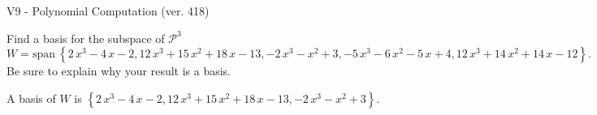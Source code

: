 \begin{exercise}
  \begin{exerciseTitle}V9 - Polynomial Computation (ver. 418)\end{exerciseTitle}
  \begin{exerciseStatement}
    Find a basis for the subspace of \(\mathcal{P}^3\) 
\[W=\mathrm{span}\ \left\{2 \, x^{3} - 4 \, x - 2 , 12 \, x^{3} + 15 \, x^{2} + 18 \, x - 13 , -2 \, x^{3} - x^{2} + 3 , -5 \, x^{3} - 6 \, x^{2} - 5 \, x + 4 , 12 \, x^{3} + 14 \, x^{2} + 14 \, x - 12\right\}.\]
 Be sure to explain why your result is a basis.


  \end{exerciseStatement}
  \begin{exerciseAnswer}
   A basis of \(W\) is  \(\left\{2 \, x^{3} - 4 \, x - 2 , 12 \, x^{3} + 15 \, x^{2} + 18 \, x - 13 , -2 \, x^{3} - x^{2} + 3\right\}\).
  


  \end{exerciseAnswer}
\end{exercise}